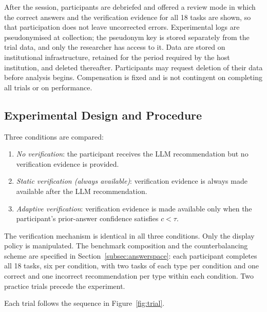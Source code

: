 \documentclass[oneside,final,14pt,a4paper]{extreport}
\begin{document}
After the session, participants are debriefed and offered a review mode in
which the correct answers and the verification evidence for all 18 tasks are
shown, so that participation does not leave uncorrected errors. Experimental
logs are pseudonymised at collection; the pseudonym key is stored separately
from the trial data, and only the researcher has access to it. Data are stored
on institutional infrastructure, retained for the period required by the host
institution, and deleted thereafter. Participants may request deletion of their
data before analysis begins. Compensation is fixed and is not contingent on
completing all trials or on performance.

\subsection{Experimental Design and Procedure}
\label{subsec:procedure}
Three conditions are compared:

\begin{enumerate}
\item \emph{No verification}: the participant receives the LLM recommendation
but no verification evidence is provided.
\item \emph{Static verification (always available)}: verification evidence is
always made available after the LLM recommendation.
\item \emph{Adaptive verification}: verification evidence is made available
only when the participant's prior-answer confidence satisfies $c<\tau$.
\end{enumerate}

The verification mechanism is identical in all three conditions. Only the
display policy is manipulated. The benchmark composition and the
counterbalancing scheme are specified in Section~\ref{subsec:answerspace}: each
participant completes all 18 tasks, six per condition, with two tasks of each
type per condition and one correct and one incorrect recommendation per type
within each condition. Two practice trials precede the experiment.

Each trial follows the sequence in Figure~\ref{fig:trial}.
\end{document}
